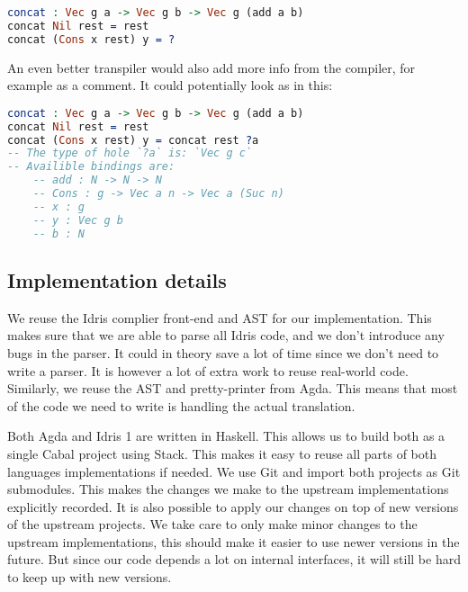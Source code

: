 \documentclass[parskip=half]{scrartcl}
\begin{document}
\begin{lstlisting}[language=Idris,label={lst:hole3},caption={}]
concat : Vec g a -> Vec g b -> Vec g (add a b)
concat Nil rest = rest
concat (Cons x rest) y = ?
\end{lstlisting}

An even better transpiler would also add more info from the compiler, for
example as a comment. It could potentially look as in this:

\begin{lstlisting}[language=Idris,label={lst:hole4},caption={}]
concat : Vec g a -> Vec g b -> Vec g (add a b)
concat Nil rest = rest
concat (Cons x rest) y = concat rest ?a
-- The type of hole `?a` is: `Vec g c`
-- Availible bindings are:
    -- add : N -> N -> N
    -- Cons : g -> Vec a n -> Vec a (Suc n)
    -- x : g
    -- y : Vec g b
    -- b : N
\end{lstlisting}


\subsection{Implementation details}

We reuse the Idris complier front-end and AST for our implementation. This
makes sure that we are able to parse all Idris code, and we don't introduce any
bugs in the parser. It could in theory save a lot of time since we don't need
to write a parser. It is however a lot of extra work to reuse real-world code.
Similarly, we reuse the AST and pretty-printer from Agda. This means that most
of the code we need to write is handling the actual translation.

%

Both Agda and Idris 1 are written in Haskell.  This allows us to build both as
a single Cabal project using Stack.  This makes it easy to reuse all parts of
both languages implementations if needed.  We use Git and import both projects
as Git submodules. This makes the changes we make to the upstream
implementations explicitly recorded. It is also possible to apply our changes
on top of new versions of the upstream projects.  We take care to only make
minor changes to the upstream implementations, this should make it easier to
use newer versions in the future.  But since our code depends a lot on internal
interfaces, it will still be hard to keep up with new versions.
\end{document}
